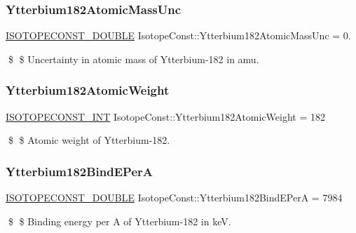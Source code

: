 \subsubsection{\texorpdfstring{Ytterbium182\+Atomic\+Mass\+Unc}{Ytterbium182AtomicMassUnc}}
{\footnotesize\ttfamily \mbox{\hyperlink{group___isotope_const-_macros_ga8f45a7272ce02c0b4c65c44636ed719a}{I\+S\+O\+T\+O\+P\+E\+C\+O\+N\+S\+T\+\_\+\+D\+O\+U\+B\+LE}} Isotope\+Const\+::\+Ytterbium182\+Atomic\+Mass\+Unc = 0.}

\$ \$ Uncertainty in atomic mass of Ytterbium-\/182 in amu. \mbox{\label{group___isotope_const-_ytterbium-_yb182_gafb574b1ec0a91bf252fd65ff3d1147e5}} 
\subsubsection{\texorpdfstring{Ytterbium182\+Atomic\+Weight}{Ytterbium182AtomicWeight}}
{\footnotesize\ttfamily \mbox{\hyperlink{group___isotope_const-_macros_ga5f18360b3e99483a35c32d789e62621c}{I\+S\+O\+T\+O\+P\+E\+C\+O\+N\+S\+T\+\_\+\+I\+NT}} Isotope\+Const\+::\+Ytterbium182\+Atomic\+Weight = 182}

\$ \$ Atomic weight of Ytterbium-\/182. \mbox{\label{group___isotope_const-_ytterbium-_yb182_ga3500d2529510262ee9c01629a58f8f9e}} 
\subsubsection{\texorpdfstring{Ytterbium182\+Bind\+E\+PerA}{Ytterbium182BindEPerA}}
{\footnotesize\ttfamily \mbox{\hyperlink{group___isotope_const-_macros_ga8f45a7272ce02c0b4c65c44636ed719a}{I\+S\+O\+T\+O\+P\+E\+C\+O\+N\+S\+T\+\_\+\+D\+O\+U\+B\+LE}} Isotope\+Const\+::\+Ytterbium182\+Bind\+E\+PerA = 7984}

\$ \$ Binding energy per A of Ytterbium-\/182 in keV. \mbox{\label{group___isotope_const-_ytterbium-_yb182_ga3c9431cdf29d97e25bac1b345d9a091f}} 
